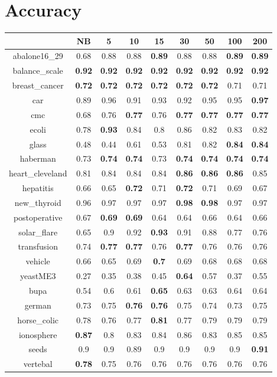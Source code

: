 \documentclass{article}%
\begin{document}
%
\normalsize%
\section*{Accuracy}%
\begin{tabular}{c|cccccccc}%
\hline%
&NB&5&10&15&30&50&100&200\\%
\hline%
abalone16\_29&0.68&0.88&0.88&\textbf{0.89}&0.88&0.88&\textbf{0.89}&\textbf{0.89}\\%
\hline%
balance\_scale&\textbf{0.92}&\textbf{0.92}&\textbf{0.92}&\textbf{0.92}&\textbf{0.92}&\textbf{0.92}&\textbf{0.92}&\textbf{0.92}\\%
\hline%
breast\_cancer&\textbf{0.72}&\textbf{0.72}&\textbf{0.72}&\textbf{0.72}&\textbf{0.72}&\textbf{0.72}&0.71&0.71\\%
\hline%
car&0.89&0.96&0.91&0.93&0.92&0.95&0.95&\textbf{0.97}\\%
\hline%
cmc&0.68&0.76&\textbf{0.77}&0.76&\textbf{0.77}&\textbf{0.77}&\textbf{0.77}&\textbf{0.77}\\%
\hline%
ecoli&0.78&\textbf{0.93}&0.84&0.8&0.86&0.82&0.83&0.82\\%
\hline%
glass&0.48&0.44&0.61&0.53&0.81&0.82&\textbf{0.84}&\textbf{0.84}\\%
\hline%
haberman&0.73&\textbf{0.74}&\textbf{0.74}&0.73&\textbf{0.74}&\textbf{0.74}&\textbf{0.74}&\textbf{0.74}\\%
\hline%
heart\_cleveland&0.81&0.84&0.84&0.84&\textbf{0.86}&\textbf{0.86}&\textbf{0.86}&0.85\\%
\hline%
hepatitis&0.66&0.65&\textbf{0.72}&0.71&\textbf{0.72}&0.71&0.69&0.67\\%
\hline%
new\_thyroid&0.96&0.97&0.97&0.97&\textbf{0.98}&\textbf{0.98}&0.97&0.97\\%
\hline%
postoperative&0.67&\textbf{0.69}&\textbf{0.69}&0.64&0.64&0.66&0.64&0.66\\%
\hline%
solar\_flare&0.65&0.9&0.92&\textbf{0.93}&0.91&0.88&0.77&0.76\\%
\hline%
transfusion&0.74&\textbf{0.77}&\textbf{0.77}&0.76&\textbf{0.77}&0.76&0.76&0.76\\%
\hline%
vehicle&0.66&0.65&0.69&\textbf{0.7}&0.69&0.68&0.68&0.68\\%
\hline%
yeastME3&0.27&0.35&0.38&0.45&\textbf{0.64}&0.57&0.37&0.55\\%
\hline%
bupa&0.54&0.6&0.61&\textbf{0.65}&0.63&0.63&0.64&0.64\\%
\hline%
german&0.73&0.75&\textbf{0.76}&\textbf{0.76}&0.75&0.74&0.73&0.75\\%
\hline%
horse\_colic&0.78&0.76&0.77&\textbf{0.81}&0.77&0.79&0.79&0.79\\%
\hline%
ionosphere&\textbf{0.87}&0.8&0.83&0.84&0.86&0.83&0.85&0.85\\%
\hline%
seeds&0.9&0.9&0.89&0.9&0.9&0.9&0.9&\textbf{0.91}\\%
\hline%
vertebal&\textbf{0.78}&0.75&0.76&0.76&0.76&0.76&0.76&0.76\\%
\hline%
\end{tabular}
\end{document}
